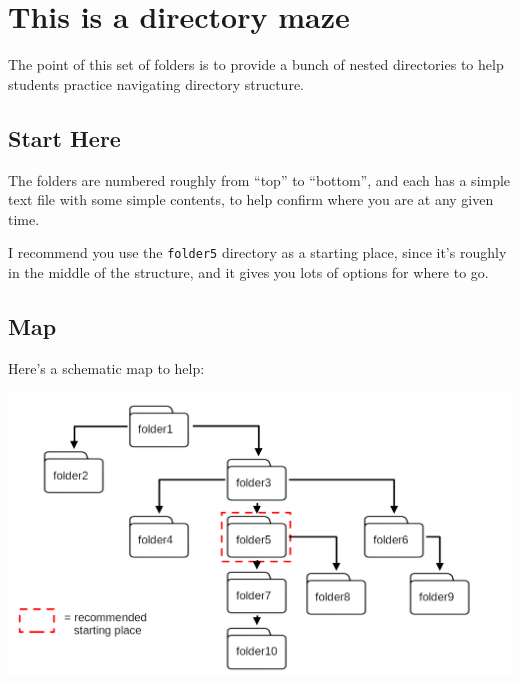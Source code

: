 \documentclass[11pt]{article}
\author{Scott Jackson}
\date{\today}
\title{}
\begin{document}
\section*{This is a directory maze}
\label{sec:org2c20b25}

The point of this set of folders is to provide a bunch of nested directories to help students practice navigating directory structure.

\subsection*{Start Here}
\label{sec:org4c1fdc3}

The folders are numbered roughly from ``top'' to ``bottom'', and each has a simple text file with some simple contents, to help confirm where you are at any given time.

I recommend you use the \texttt{folder5} directory as a starting place, since it's roughly in the middle of the structure, and it gives you lots of options for where to go.

\subsection*{Map}
\label{sec:orge32499c}

Here's a schematic map to help:

\begin{center}
\includegraphics[width=.9\linewidth]{./folder_map.png}
\end{center}
\end{document}
